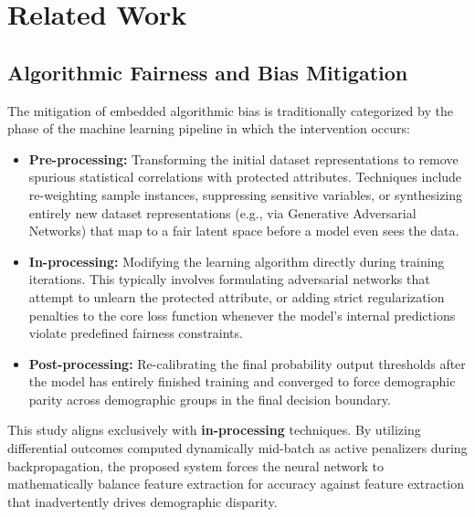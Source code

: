 \documentclass[12pt,a4paper]{article}
\begin{document}
\section{Related Work}

\subsection{Algorithmic Fairness and Bias Mitigation}
The mitigation of embedded algorithmic bias is traditionally categorized by the phase of the machine learning pipeline in which the intervention occurs:
\begin{itemize}
    \item \textbf{Pre-processing:} Transforming the initial dataset representations to remove spurious statistical correlations with protected attributes. Techniques include re-weighting sample instances, suppressing sensitive variables, or synthesizing entirely new dataset representations (e.g., via Generative Adversarial Networks) that map to a fair latent space before a model even sees the data.
    \item \textbf{In-processing:} Modifying the learning algorithm directly during training iterations. This typically involves formulating adversarial networks that attempt to unlearn the protected attribute, or adding strict regularization penalties to the core loss function whenever the model's internal predictions violate predefined fairness constraints.
    \item \textbf{Post-processing:} Re-calibrating the final probability output thresholds after the model has entirely finished training and converged to force demographic parity across demographic groups in the final decision boundary.
\end{itemize}
This study aligns exclusively with \textbf{in-processing} techniques. By utilizing differential outcomes computed dynamically mid-batch as active penalizers during backpropagation, the proposed system forces the neural network to mathematically balance feature extraction for accuracy against feature extraction that inadvertently drives demographic disparity.
\end{document}
